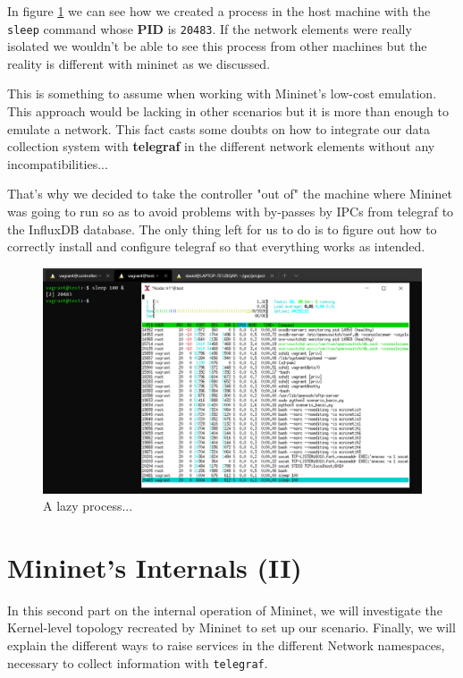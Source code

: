 \documentclass[12pt]{article}
\newcommand{\newpar} {
    \vskip 1cm
}
\begin{document}
        \newpar
		In figure \ref{f:x_htop} we can see how we created a process in the host machine with the \texttt{sleep} command whose \textbf{PID} is \texttt{20483}. If the network elements were really isolated we wouldn't be able to see this process from other machines but the reality is different with mininet as we discussed.
		\newpar
		This is something to assume when working with Mininet's low-cost emulation. This approach would be lacking in other scenarios but it is more than enough to emulate a network. This fact casts some doubts on how to integrate our data collection system with \textbf{telegraf} in the different network elements without any incompatibilities...
		\newpar
		That's why we decided to take the controller "out of" the machine where Mininet was going to run so as to avoid problems with by-passes by IPCs from telegraf to the InfluxDB database. The only thing left for us to do is to figure out how to correctly install and configure telegraf so that everything works as intended.
		\newpage

		\begin{figure}[!htb]
			\centering
			\includegraphics[width=\linewidth]{x_htop.png}
			\caption{A lazy process...}
			\label{f:x_htop}
		\end{figure}
		
\newpage

\section{Mininet's Internals (II)}
	In this second part on the internal operation of Mininet, we will investigate the Kernel-level topology recreated by Mininet to set up our scenario. Finally, we will explain the different ways to raise services in the different Network namespaces, necessary to collect information with \texttt{telegraf}. 
\end{document}
